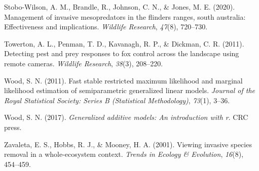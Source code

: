 \documentclass[]{elsarticle} %
\begin{document}
\leavevmode\hypertarget{ref-stobo2020management}{}%
Stobo-Wilson, A. M., Brandle, R., Johnson, C. N., \& Jones, M. E. (2020). Management of invasive mesopredators in the flinders ranges, south australia: Effectiveness and implications. \emph{Wildlife Research}, \emph{47}(8), 720--730.

\leavevmode\hypertarget{ref-towerton2011}{}%
Towerton, A. L., Penman, T. D., Kavanagh, R. P., \& Dickman, C. R. (2011). Detecting pest and prey responses to fox control across the landscape using remote cameras. \emph{Wildlife Research}, \emph{38}(3), 208--220.

\leavevmode\hypertarget{ref-wood2011}{}%
Wood, S. N. (2011). Fast stable restricted maximum likelihood and marginal likelihood estimation of semiparametric generalized linear models. \emph{Journal of the Royal Statistical Society: Series B (Statistical Methodology)}, \emph{73}(1), 3--36.

\leavevmode\hypertarget{ref-wood2017}{}%
Wood, S. N. (2017). \emph{Generalized additive models: An introduction with r}. CRC press.

\leavevmode\hypertarget{ref-zavaleta2001}{}%
Zavaleta, E. S., Hobbs, R. J., \& Mooney, H. A. (2001). Viewing invasive species removal in a whole-ecosystem context. \emph{Trends in Ecology \& Evolution}, \emph{16}(8), 454--459.
\end{document}
